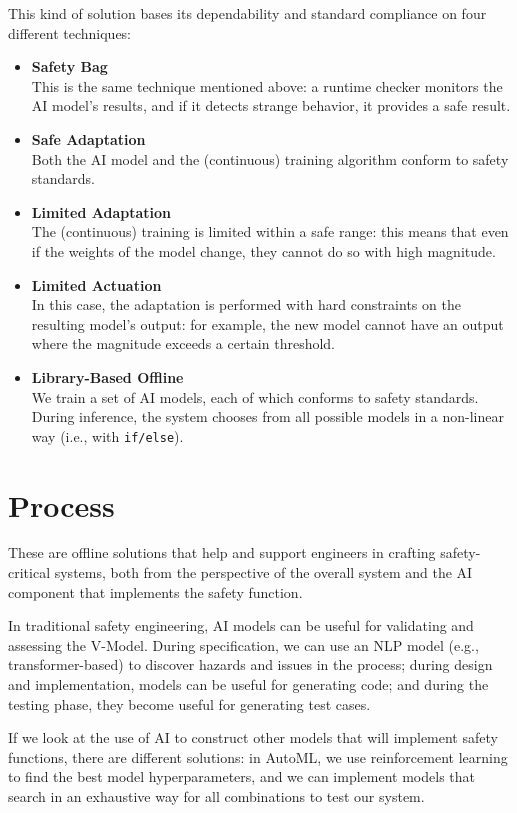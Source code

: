 This kind of solution bases its dependability and standard compliance on four different techniques:
\begin{itemize}
    \item \textbf{Safety Bag} \\
        This is the same technique mentioned above: a runtime checker monitors the AI model's results, and if it detects strange behavior, it provides a safe result.
    \item \textbf{Safe Adaptation} \\
        Both the AI model and the (continuous) training algorithm conform to safety standards.
    \item \textbf{Limited Adaptation} \\
        The (continuous) training is limited within a safe range: this means that even if the weights of the model change, they cannot do so with high magnitude.
    \item \textbf{Limited Actuation} \\
        In this case, the adaptation is performed with hard constraints on the resulting model's output: for example, the new model cannot have an output where the magnitude exceeds a certain threshold.
    \item \textbf{Library-Based Offline} \\
        We train a set of AI models, each of which conforms to safety standards. During inference, the system chooses from all possible models in a non-linear way (i.e., with \texttt{if/else}).
\end{itemize}

\section{Process}
These are offline solutions that help and support engineers in crafting safety-critical systems, both from the perspective of the overall system and the AI component that implements the safety function.

\myskip

In traditional safety engineering, AI models can be useful for validating and assessing the V-Model. During specification, we can use an NLP model (e.g., transformer-based) to discover hazards and issues in the process; during design and implementation, models can be useful for generating code; and during the testing phase, they become useful for generating test cases.

If we look at the use of AI to construct other models that will implement safety functions, there are different solutions: in AutoML, we use reinforcement learning to find the best model hyperparameters, and we can implement models that search in an exhaustive way for all combinations to test our system.